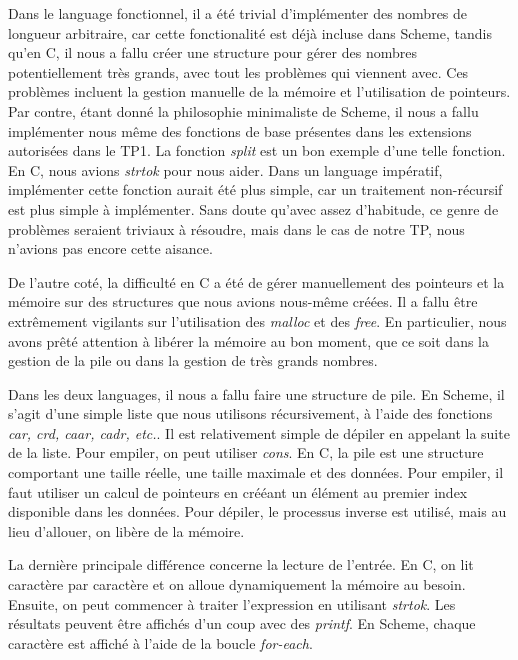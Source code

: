 \documentclass[letterpaper,12pt]{scrartcl}
\begin{document}
	Dans le language fonctionnel, il a été trivial d'implémenter des nombres de longueur arbitraire, car cette fonctionalité est déjà incluse dans Scheme, tandis qu'en C, il nous a fallu créer une structure pour gérer des nombres potentiellement très grands, avec tout les problèmes qui viennent avec. Ces problèmes incluent la gestion manuelle de la mémoire et l'utilisation de pointeurs. Par contre, étant donné la philosophie minimaliste de Scheme, il nous a fallu implémenter nous même des fonctions de base présentes dans les extensions autorisées dans le TP1. La fonction \textit{split} est un bon exemple d'une telle fonction. En C, nous avions \textit{strtok} pour nous aider. Dans un language impératif, implémenter cette fonction aurait été plus simple, car un traitement non-récursif est plus simple à implémenter. Sans doute qu'avec assez d'habitude, ce genre de problèmes seraient triviaux à résoudre, mais dans le cas de notre TP, nous n'avions pas encore cette aisance.
	
	\vspace{0.5cm}
	
	De l'autre coté, la difficulté en C a été de gérer manuellement des pointeurs et la mémoire sur des structures que nous avions nous-même créées. Il a fallu être extrêmement vigilants sur l'utilisation des \textit{malloc} et des \textit{free}. En particulier, nous avons prêté attention à libérer la mémoire au bon moment, que ce soit dans la gestion de la pile ou dans la gestion de très grands nombres.
	
	\vspace{0.5cm}
	
	Dans les deux languages, il nous a fallu faire une structure de pile. En Scheme, il s'agit d'une simple liste que nous utilisons récursivement, à l'aide des fonctions \textit{car, crd, caar, cadr, etc.}. Il est relativement simple de dépiler en appelant la suite de la liste. Pour empiler, on peut utiliser \textit{cons}.  En C, la pile est une structure comportant une taille réelle, une taille maximale et des données. Pour empiler, il faut utiliser un calcul de pointeurs en crééant un élément au premier index disponible dans les données. Pour dépiler, le processus inverse est utilisé, mais au lieu d'allouer, on libère de la mémoire.
	
	\vspace{0.5cm}
	
	La dernière principale différence concerne la lecture de l'entrée. En C, on lit caractère par caractère et on alloue dynamiquement la mémoire au besoin. Ensuite, on peut commencer à traiter l'expression en utilisant \textit{strtok}. Les résultats peuvent être affichés d'un coup avec des \textit{printf}. En Scheme, chaque caractère est affiché à l'aide de la boucle \textit{for-each}.
\end{document}
